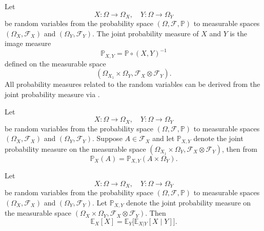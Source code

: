 \begin{definition}
	\label{def:joint}
	Let
	\begin{equation}
		X\colon \Omega \to \Omega_X, \quad Y\colon \Omega \to \Omega_Y
	\end{equation}
	be random variables from the probability space $(\Omega, \mathcal{F}, \mathbb{P})$ to measurable spaces $(\Omega_X, \mathcal{F}_X)$ and $(\Omega_Y, \mathcal{F}_Y)$.	The joint probability measure of $X$ and $Y$ is the image measure
	\begin{equation}
		\mathbb{P}_{X,Y} = \mathbb{P}\circ(X,Y)^{-1}
	\end{equation}
	defined on the measurable space 
	\begin{equation}
		(\Omega_{X_1}\times\Omega_{Y}, \mathcal{F}_{X}\otimes\mathcal{F}_{Y}).
	\end{equation}	
	All probability measures related to the random variables can be derived from the joint probability measure via .
\end{definition}

\begin{remark}
	Let
	\begin{equation}
		X\colon \Omega \to \Omega_X, \quad Y\colon \Omega \to \Omega_Y
	\end{equation}
	be random variables from the probability space $(\Omega, \mathcal{F}, \mathbb{P})$ to measurable spaces $(\Omega_X, \mathcal{F}_X)$ and $(\Omega_Y, \mathcal{F}_Y)$. Suppose $A\in \mathcal{F}_X$ and let $\mathbb{P}_{X,Y}$ denote the joint probability measure on the measurable space $(\Omega_{X_1}\times\Omega_{Y}, \mathcal{F}_{X}\otimes\mathcal{F}_{Y})$, then from 
	\begin{equation}
			\mathbb{P}_{X}(A) = \mathbb{P}_{X,Y}(A \times \Omega_Y).
	\end{equation}
\end{remark}


\begin{theorem}
	\label{theorem:total_expectation}
	Let
	\begin{equation}
		X\colon \Omega \to \Omega_X, \quad Y\colon \Omega \to \Omega_Y
	\end{equation}
	be random variables from the probability space $(\Omega, \mathcal{F}, \mathbb{P})$ to measurable spaces $(\Omega_X, \mathcal{F}_X)$ and $(\Omega_Y, \mathcal{F}_Y)$. Let $\mathbb{P}_{X,Y}$ denote the joint probability measure on the measurable space $(\Omega_X \times \Omega_Y, \mathcal{F}_X \otimes \mathcal{F}_Y)$. Then
	\begin{equation}
		\mathbb{E}_X[X] = \mathbb{E}_Y\big[\mathbb{E}_{X|Y}[X \mid Y]\big].
	\end{equation}
\end{theorem}


